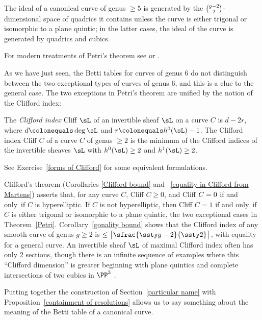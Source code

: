 \begin{theorem} [Petri]\label{Petri}
The ideal of a canonical curve of genus $\geq 5$ is generated by the
%
$\tbinom{g-2}{ 2}$-dimensional space of quadrics it contains unless the curve
is either trigonal or isomorphic to a plane quintic; in the latter cases,
the ideal of the curve is generated by quadrics and cubics.
\unif
\end{theorem}

For modern treatments of Petri's theorem see
\cite{Schreyer} or \cite{Arbarello-Sernesi}.

As we have just seen, the Betti tables for curves of genus 6
do not distinguish between the two exceptional types of 
curves of genus 6, and this is a clue to the general case.
The two exceptions in Petri's theorem are unified  by  the 
notion of the
%
Clifford index:

\begin{definition}
The \emph{Clifford index} Cliff $\sL$ of an invertible sheaf $\sL$ on a curve
%
$C$ is $d-2r$, where $d \colonequals  \deg \sL$ and $r \colonequals
h^0(\sL)-1$. The Clifford index Cliff $C$ of
a curve $C$ of genus $\geq 2$ is the minimum of the Clifford indices
of the invertible sheaves $\sL$  with $h^{0}(\sL) \geq 2$ and $h^{1}(\sL)\geq 2$.
\unif
\end{definition}
See Exercise~\ref{forms of Clifford} for some equivalent formulations.

Clifford's theorem (Corollaries \ref{Clifford bound} and ~\ref{equality
in Clifford from Martens}) asserts that, for any curve $C$,
 Cliff $C \geq 0$, and Cliff $C =
\index{Clifford's theorem}%
0$ if and only~if $C$ is hyperelliptic. If $C$ is not hyperelliptic, then
 Cliff $C=1$ if and only~if $C$ is either trigonal or
isomorphic to a plane quintic, the two exceptional cases in Theorem~\ref{Petri}.
Corollary~\ref{gonality bound} 
 shows
 that the Clifford index of any smooth curve of
genus $g\geq 2$ is $\leq \bigl\lceil \sfrac{\ssty g-2}{\ssty 2} \bigr\rceil$, 
with equality for a general
curve. An invertible sheaf $\sL$ of maximal Clifford index often has only
2 sections, though there is an infinite sequence of examples where this
``Clifford dimension'' is greater beginning with plane quintics
and complete intersections of two cubics in $\PP^{3}$ \cite{MR1030141}.

Putting together the construction of Section~\ref{particular name} with
Proposition~\ref{containment of resolutions} allows us to say
something about the meaning of the Betti table of a canonical curve.

